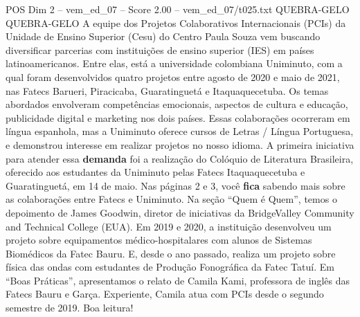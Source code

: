\begin{textsample}{POS Dim 2 – vem\_ed\_07 – Score 2.00 – vem\_ed\_07/t025.txt}  \label{ex:f2_pos_159}
QUEBRA-GELO QUEBRA-GELO A equipe dos Projetos Colaborativos Internacionais (PCIs) da Unidade de Ensino Superior (Cesu) do Centro Paula Souza vem buscando diversificar parcerias com instituições de ensino superior (IES) em países latinoamericanos.
Entre elas, está a universidade colombiana Uniminuto, com a qual foram desenvolvidos quatro projetos entre agosto de 2020 e maio de 2021, nas Fatecs Barueri, Piracicaba, Guaratinguetá e Itaquaquecetuba.
Os temas abordados envolveram competências emocionais, aspectos de cultura e educação, publicidade digital e marketing nos dois países.
Essas colaborações ocorreram em língua espanhola, mas a Uniminuto oferece cursos de Letras / Língua Portuguesa, e demonstrou interesse em realizar projetos no nosso idioma.
A primeira iniciativa para atender essa \textbf{demanda} foi a realização do Colóquio de Literatura Brasileira, oferecido aos estudantes da Uniminuto pelas Fatecs Itaquaquecetuba e Guaratinguetá, em 14 de maio.
Nas páginas 2 e 3, você \textbf{fica} sabendo mais sobre as colaborações entre Fatecs e Uniminuto.
Na seção “Quem é Quem”, temos o depoimento de James Goodwin, diretor de iniciativas da BridgeValley Community and Technical College (EUA).
Em 2019 e 2020, a instituição desenvolveu um projeto sobre equipamentos médico-hospitalares com alunos de Sistemas Biomédicos da Fatec Bauru.
E, desde o ano passado, realiza um projeto sobre física das ondas com estudantes de Produção Fonográfica da Fatec Tatuí.
Em “Boas Práticas”, apresentamos o relato de Camila Kami, professora de inglês das Fatecs Bauru e Garça.
Experiente, Camila atua com PCIs desde o segundo semestre de 2019.
Boa leitura!

\end{textsample}
